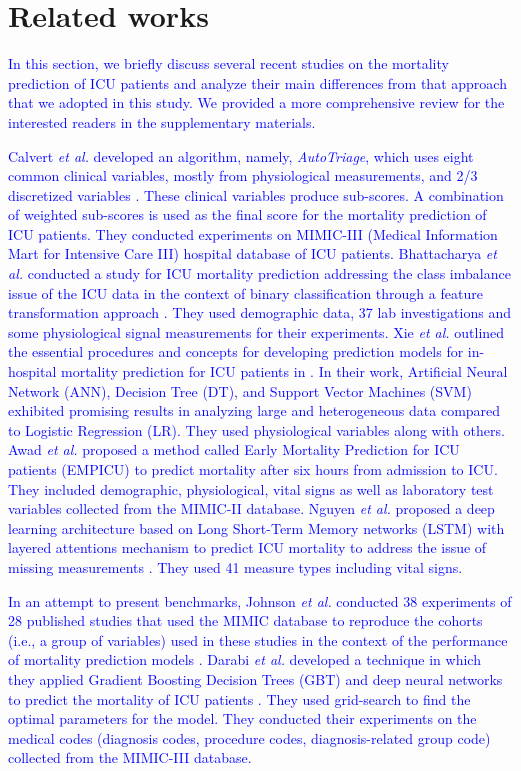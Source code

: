 \section{Related works} \label{s:related}
\textcolor{blue}{ In this section, we briefly discuss several recent studies on the mortality prediction of ICU patients and analyze their main differences from that approach that we adopted in this study. We provided a more comprehensive review for the interested readers in the supplementary materials.}

\textcolor{blue}{Calvert \textit{et al.} developed an algorithm, namely, \textit{AutoTriage}, which uses eight common clinical variables, mostly from physiological measurements, and 2/3 discretized variables \cite{Calvert2016}. These clinical variables produce sub-scores. A combination of weighted sub-scores is used as the final score for the mortality prediction of ICU patients. They conducted experiments on MIMIC-III (Medical Information Mart for Intensive Care III) hospital database of ICU patients. Bhattacharya \textit{et al.} conducted a study for ICU mortality prediction addressing the class imbalance issue of the ICU data in the context of binary classification through a feature transformation approach \cite{Bhattacharya2017}. They used demographic data, 37 lab investigations and some physiological signal measurements for their experiments. Xie \textit{et al.} outlined the essential procedures and concepts for developing prediction models for in-hospital mortality prediction for ICU patients in \cite{Xie2017}. In their work, Artificial Neural Network (ANN), Decision Tree (DT), and Support Vector Machines (SVM) exhibited promising results in analyzing large and heterogeneous data compared to Logistic Regression (LR). They used physiological variables along with others. Awad \textit{et al.} proposed a method called Early Mortality Prediction for ICU patients (EMPICU) \cite{Awad2017} to predict mortality after six hours from admission to ICU. They included demographic, physiological, vital signs as well as laboratory test variables collected from the MIMIC-II database. Nguyen \textit{et al.} proposed a deep learning architecture based on Long Short-Term Memory networks (LSTM) with layered attentions mechanism to predict ICU mortality to address the issue of missing measurements \cite{Nguyen2017}. They used 41 measure types including vital signs.} 

\textcolor{blue}{In an attempt to present benchmarks, Johnson \textit{et al.} conducted 38 experiments of 28 published studies that used the MIMIC database to reproduce the cohorts (i.e., a group of variables) used in these studies in the context of the performance of mortality prediction models \cite{Johnson2nd2017}. Darabi \textit{et al.} developed a technique in which they applied Gradient Boosting Decision Trees (GBT) and deep neural networks to predict the mortality of ICU patients \cite{Darabi2018}. They used grid-search to find the optimal parameters for the model. They conducted their experiments on the medical codes (diagnosis codes, procedure codes, diagnosis-related group code) collected from the MIMIC-III database.} 

